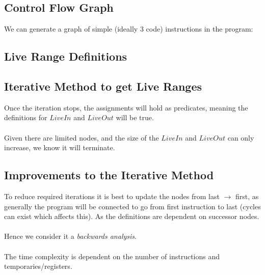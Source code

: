 \documentclass{report}
\begin{document}
        \subsection*{Control Flow Graph}
            We can generate a graph of simple  (ideally 3 code) instructions in the program:
            

        \subsection*{Live Range Definitions}

        \subsection*{Iterative Method to get Live Ranges}
            Once the iteration stops, the assignments will hold as predicates, meaning the definitions for $LiveIn$ and $LiveOut$ will be true.
            \\
            \\ Given there are limited nodes, and the size of the $LiveIn$ and $LiveOut$ can only increase, we know it will terminate.

        \subsection*{Improvements to the Iterative Method}
            To reduce required iterations it is best to update the nodes from last $\to$ first, as generally the program will be connected to go from first instruction to last (cycles can exist which affects this). As the definitions are dependent on successor nodes.
            \\
            \\ Hence we consider it a \textit{backwards analysis}.
            \\
            \\ The time complexity is dependent on the number of instructions and temporaries/registers.
\end{document}
